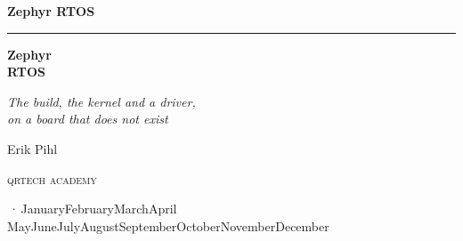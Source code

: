 %
\providecommand{\bookversion}{}
\newcommand{\bookdate}{\number\day\space\ifcase\month\or January\or February\or March\or April\or
  May\or June\or July\or August\or September\or October\or November\or December\fi\space
  \number\year}
\newcommand{\bookedition}{\ifx\bookversion\empty\else\bookversion\,·\,\fi\bookdate}

\thispagestyle{empty}
\vspace*{2.2in}
\begin{flushright}
  {\Large\bfseries Zephyr RTOS}
\end{flushright}
\cleardoublepage

\thispagestyle{empty}
\vspace*{1.1in}
\begin{flushleft}
  {\color{accent}\rule{0.9in}{2.5pt}}\par\vspace{1.4ex}
  {\fontsize{32}{38}\selectfont\bfseries Zephyr\\[0.15ex] RTOS\par}
  \vspace{2.2ex}
  {\Large\itshape The build, the kernel and a driver,\\on a board that does not exist\par}
  \vspace{1.2in}
  {\large Erik Pihl\par}
  \vfill
  {\small\scshape\lsstyle qrtech academy\par}
  \vspace{0.6ex}
  {\small\color{muted} \bookedition\par}
\end{flushleft}
\newpage

